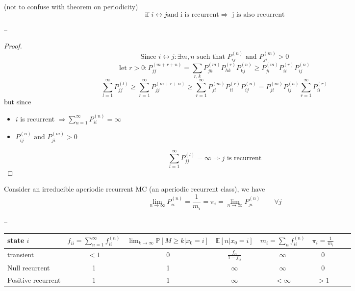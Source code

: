 \begin{theorem}
(not to confuse with theorem on periodicity)
$$\mbox{if } i\leftrightarrow j \mbox{and i is recurrent} \Rightarrow \mbox{ j is also recurrent}$$
\end{theorem}
--
\begin{proof}
$$\mbox{Since } i\leftrightarrow j : \exists m,n \mbox{ such that } P_{ij}^{(n)} \mbox{ and } P_{ji}^{(m)} > 0$$
$$\mbox{let } r>0 : P_{jj}^{(m+r+n)} = \sum_{r, k} P_{jh}^{(m)} P_{hk}^{(r)} P_{kj}^{(n)} \geq P_{ji}^{(m)}  P_{ii}^{(r)}  P_{ij}^{(n)}$$
$$\sum_{l=1}^\infty P_{jj}^{(l)} \geq \sum_{r=1}^\infty P_{jj}^{(m+r+n)} \geq \sum_{r=1}^\infty P_{ji}^{(m)}  P_{ii}^{(r)}  P_{ij}^{(n)} = P_{ji}^{(m)} P_{ij}^{(n)} \sum_{r=1}^\infty P_{ii}^{(r)}$$
but since \begin{itemize}
\item$i$ is recurrent $\Rightarrow \sum_{n=1}^\infty P_{ii}^{(n)} = \infty$
\item $P_{ij}^{(n)} \mbox{ and } P_{ji}^{(m)} > 0$
\end{itemize}
$$\sum_{l=1}^\infty P_{jj}^{(l)} = \infty \Rightarrow j \mbox{ is recurrent}$$

\end{proof}

\begin{theorem}
Consider an irreducible aperiodic recurrent MC (an aperiodic recurrent class), we have
$$ \lim_{n\to \infty} P_{ii}^{(n)} = \frac{1}{m_i} = \pi_i = \lim_{n\to\infty} P_{ji}^{(n)} \qquad \forall j$$
\end{theorem}
--

\begin{center}
    \begin{tabular}{|l*{6}{|c}r}
        \hline
    state $i$ & $f_{ii} = \sum_{n=1}^\infty f_{ii}^{(n)}$  & $\lim_{k \to \infty } \mathbb{P}[M \geq k | x_0=i]$ & $\mathbb{E}[n|x_0=i]$ & $m_i = \sum_n f_{ii}^{(n)}$ & $\pi_i = \frac{1}{m_i}$  \\ \hline

    transient & $<1$ & 0 & $\frac{f_{ii}}{1-f_{ii}}$ & $\infty$ & 0 \\ \hline
    Null recurrent & 1 & 1 & $\infty$ & $\infty$ & 0 \\ \hline
    Positive recurrent & 1 & 1 & $\infty$ & $<\infty$ & $>1$ \\ \hline
        \end{tabular}
\end{center}

